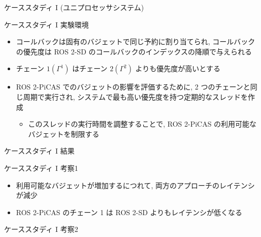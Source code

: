 \begin{frame}{ケーススタディ I (ユニプロセッサシステム)}
\end{frame}

\begin{frame}{ケーススタディ I 実験環境}
    \begin{itemize}
        \item コールバックは固有のバジェットで同じ予約に割り当てられ, コールバックの優先度は ROS 2-SD のコールバックのインデックスの降順で与えられる
        \item チェーン $1\left(\Gamma^{1}\right)$ はチェーン $2\left(\Gamma^{2}\right)$ よりも優先度が高いとする
        \item ROS 2-PiCAS でのバジェットの影響を評価するために, 2 つのチェーンと同じ周期で実行され, システムで最も高い優先度を持つ定期的なスレッドを作成
              \begin{itemize}
                  \item このスレッドの実行時間を調整することで, ROS 2-PiCAS の利用可能なバジェットを制限する
              \end{itemize}
    \end{itemize}
\end{frame}

\begin{frame}{ケーススタディ I 結果}
\end{frame}

\begin{frame}{ケーススタディ I 考察1}
    \begin{itemize}
        \item 利用可能なバジェットが増加するにつれて, 両方のアプローチのレイテンシが減少
        \item ROS 2-PiCAS のチェーン 1 は ROS 2-SD よりもレイテンシが低くなる
    \end{itemize}
\end{frame}

\begin{frame}{ケーススタディ I 考察2}
\end{frame}


